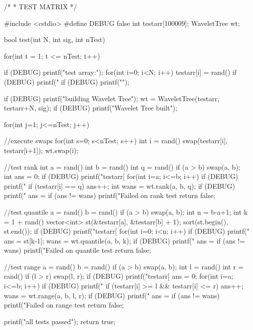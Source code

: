 \documentclass[11pt]{article}
\begin{document}
\begin{vncode}
/*
 * TEST MATRIX
 */

#include <cstdio>
#define DEBUG false
int testarr[100009];
WaveletTree wt;

bool test(int N, int sig, int nTest) {
	for(int t = 1; t <= nTest; t++) {
		if (DEBUG) printf("test array:");
		for(int i=0; i<N; i++) {
			testarr[i] = rand()%
			if (DEBUG) printf(" %
		}
		if (DEBUG) printf("\n");
		
		if (DEBUG) printf("building Wavelet Tree\n");
		wt = WaveletTree(testarr, testarr+N, sig);
		if (DEBUG) printf("Wavelet Tree built\n");
		
		for(int j=1; j<=nTest; j++) {
			
			//execute swaps
			for(int s=0; s<nTest; s++) {
				int i = rand()%
				swap(testarr[i], testarr[i+1]);
				wt.swap(i);
			}
			
			//test rank
			int a = rand()%
			int b = rand()%
			int q = rand()%
			if (a > b) swap(a, b);
			int ans = 0;
			if (DEBUG) printf("testarr[%
			for(int i=a; i<=b; i++) {
				if (DEBUG) printf(" %
				if (testarr[i] == q) ans++;
			}
			int wans = wt.rank(a, b, q);
			if (DEBUG) printf(" ans = %
			if (ans != wans) {
				printf("Failed on rank test %
				return false;
			}
		
			//test quantile
			a = rand()%
			b = rand()%
			if (a > b) swap(a, b);
			int n = b-a+1;
			int k = 1 + rand()%
			vector<int> st(&testarr[a], &testarr[b] + 1);
			sort(st.begin(), st.end());
			if (DEBUG) printf("testarr[%
			for(int i=0; i<n; i++) {
				if (DEBUG) printf(" %
			}
			ans = st[k-1];
			wans = wt.quantile(a, b, k);
			if (DEBUG) printf(" ans = %
			if (ans != wans) {
				printf("Failed on quantile test %
				return false;
			}
			
			//test range
			a = rand()%
			b = rand()%
			if (a > b) swap(a, b);
			int l = rand()%
			int r = rand()%
			if (l > r) swap(l, r);
			if (DEBUG) printf("testarr[%
			ans = 0;
			for(int i=a; i<=b; i++) {
				if (DEBUG) printf(" %
				if (testarr[i] >= l && testarr[i] <= r) ans++;
			}
			wans = wt.range(a, b, l, r);
			if (DEBUG) printf(" ans = %
			if (ans != wans) {
				printf("Failed on range test %
				return false;
			}
		}
	}
	printf("all tests passed\n");
	return true;
}


\end{vncode}
\end{document}
